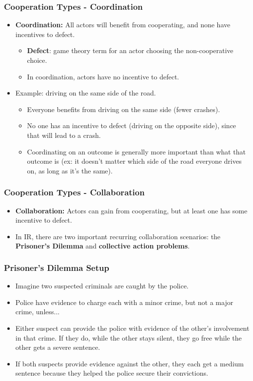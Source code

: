 \documentclass[handout]{beamer}
\begin{document}
\begin{frame} 
\frametitle{\LARGE{Cooperation Types - Coordination}}
     \begin{itemize}
         \item \textbf{Coordination:} All actors will benefit from cooperating, and none have incentives to defect. \pause
         \begin{itemize}
         	\item \textbf{Defect}: game theory term for an actor choosing the non-cooperative choice.
             \item In coordination, actors have no incentive to defect. \pause
         \end{itemize}
         \item Example: driving on the same side of the road. \pause
         \begin{itemize}
         	\item Everyone benefits from driving on the same side (fewer crashes). \pause
         	\item No one has an incentive to defect (driving on the opposite side), since that will lead to a crash. \pause
         	\item Coordinating on an outcome is generally more important than what that outcome is (ex: it doesn't matter which side of the road everyone drives on, as long as it's the same).
         \end{itemize}
     \end{itemize}
\end{frame}
     
\begin{frame} 
   	\frametitle{\LARGE{Cooperation Types - Collaboration}}
   	\begin{itemize} 
     \item \textbf{Collaboration:} Actors can gain from cooperating, but at least one has some incentive to defect. \pause
     \item In IR, there are two important recurring collaboration scenarios: the \textbf{Prisoner's Dilemma} and \textbf{collective action problems}.
 \end{itemize}
\end{frame}

 \begin{frame} 
 \frametitle{\LARGE{Prisoner's Dilemma Setup}}
 	\begin{itemize}
 		\item Imagine two suspected criminals are caught by the police. \pause
 		\item Police have evidence to charge each with a minor crime, but not a major crime, unless... \pause
 		\item Either suspect can provide the police with evidence of the other's involvement in that crime. If they do, while the other stays silent, they go free while the other gets a severe sentence. \pause
 		\item If both suspects provide evidence against the other, they each get a medium sentence because they helped the police secure their convictions.
 	\end{itemize}
 \end{frame}
\end{document}
